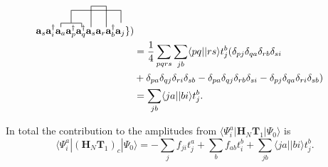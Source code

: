 \documentclass[a4paper,norsk,11pt,twoside]{report}
\begin{document}
\begin{align}
{\textbf{a}_s}
\contraction
{\textbf{a}^{\dag}_i}
{\textbf{a}_a}
{\textbf{a}^{\dag}_p}
{\textbf{a}^{\dag}_q}
\contraction[3ex]
{\textbf{a}^{\dag}_i \textbf{a}_a}
{\textbf{a}^{\dag}_p}
{\textbf{a}^{\dag}_q \textbf{a}_s \textbf{a}_r \textbf{a}^{\dag}_b}{\textbf{a}_j}
\contraction[5ex]{\textbf{a}^{\dag}_i \textbf{a}_a 
\textbf{a}^{\dag}_p \textbf{a}^{\dag}_q
}{\textbf{a}_s}{}{\textbf{a}_r \textbf{a}^{\dag}_b}
\textbf{a}^{\dag}_i \textbf{a}_a 
\textbf{a}^{\dag}_p \textbf{a}^{\dag}_q
\textbf{a}_s \textbf{a}_r
\textbf{a}^{\dag}_b \textbf{a}_j
\} ) \nonumber \\ &
=  \frac{1}{4} \sum_{pqrs} \sum_{jb} \langle pq||rs \rangle t_j^b (
\delta_{pj} \delta_{qa} \delta_{rb} \delta_{si} \nonumber \\ &
+ \delta_{pa} \delta_{qj} \delta_{ri} \delta_{sb}
- \delta_{pa} \delta_{qj} \delta_{rb} \delta_{si}
- \delta_{pj} \delta_{qa} \delta_{ri} \delta_{sb} ) \nonumber \\ &
= \sum_{jb} \langle ja||bi \rangle t_j^b .
\end{align}

In total the contribution to the amplitudes from $\langle \Psi_i^a | \textbf{H}_N \textbf{T}_1 | \Psi_0 \rangle$ is
\begin{equation}
\langle \Psi_i^a | (\textbf{H}_N \textbf{T}_1)_c | \Psi_0 \rangle = - \sum_j f_{ji} t_j^a + \sum_b f_{ab} t_i^b
\nonumber +  \sum_{jb} \langle ja||bi \rangle t_j^b . \label{t1amp_2}
\end{equation}
\end{document}
